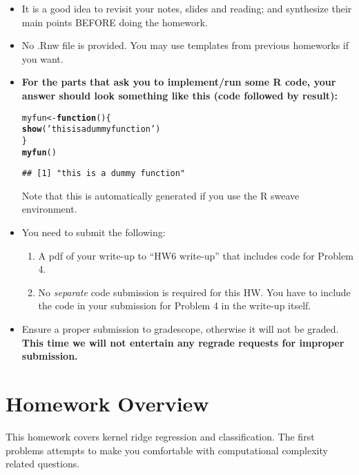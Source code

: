 \documentclass[11pt]{article}\usepackage[]{graphicx}\usepackage[]{color}
\makeatletter
\newcommand{\hlstr}[1]{\textcolor[rgb]{0.192,0.494,0.8}{#1}}%
\newcommand{\hlstd}[1]{\textcolor[rgb]{0.345,0.345,0.345}{#1}}%
\newcommand{\hlkwa}[1]{\textcolor[rgb]{0.161,0.373,0.58}{\textbf{#1}}}%
\newcommand{\hlkwb}[1]{\textcolor[rgb]{0.69,0.353,0.396}{#1}}%
\newcommand{\hlkwd}[1]{\textcolor[rgb]{0.737,0.353,0.396}{\textbf{#1}}}%
\newenvironment{kframe}{%
 \def\at@end@of@kframe{}%
 \ifinner\ifhmode%
  \def\at@end@of@kframe{\end{minipage}}%
  \begin{minipage}{\columnwidth}%
 \fi\fi%
 \def\FrameCommand##1{\hskip\@totalleftmargin \hskip-\fboxsep
 \colorbox{shadecolor}{##1}\hskip-\fboxsep
     \hskip-\linewidth \hskip-\@totalleftmargin \hskip\columnwidth}%
 \MakeFramed {\advance\hsize-\width
   \@totalleftmargin\z@ \linewidth\hsize
   \@setminipage}}%
 {\par\unskip\endMakeFramed%
 \at@end@of@kframe}
\newenvironment{knitrout}{}{} %
\makeatother
\begin{document}
\begin{itemize}
\item It is a good idea to revisit your notes, slides and reading;
and synthesize their main points BEFORE doing the
homework.

\item No .Rnw file is provided. You may use templates from previous homeworks
if you want.

\item \textbf{For the parts that ask you to 
implement/run some R code, your answer
should look something like this (code followed by result):}
\begin{knitrout}
\color{fgcolor}\begin{kframe}
\begin{alltt}
\hlstd{myfun}\hlkwb{<-} \hlkwa{function}\hlstd{()\{}
\hlkwd{show}\hlstd{(}\hlstr{'this is a dummy function'}\hlstd{)}
\hlstd{\}}
\hlkwd{myfun}\hlstd{()}
\end{alltt}
\begin{verbatim}
## [1] "this is a dummy function"
\end{verbatim}
\end{kframe}
\end{knitrout}
Note that this is automatically generated if you use
the R sweave environment.

\item You need to submit the following:
\begin{enumerate}
\item A pdf of your write-up to ``HW6 write-up'' that includes code for
Problem 4.
\item No \emph{separate} code submission is required for this HW. You have
to include the code in your submission for Problem 4 in the write-up itself.
\end{enumerate}
\item Ensure a proper submission to gradescope, otherwise it will
not be graded. \textbf{This time we will not entertain any regrade
requests for improper submission.}
\end{itemize}

\section*{Homework Overview}
This homework covers kernel ridge regression and classification. The first
problems attempts to make you comfortable with computational complexity
related questions.
\newpage
\end{document}
